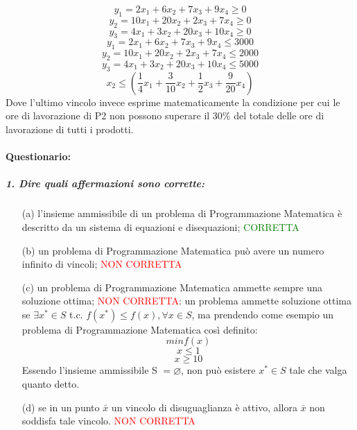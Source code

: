 \begin{equation*}
    y_1 = 2x_1 + 6x_2 + 7x_3 + 9x_4 \geq 0
\end{equation*}
\begin{equation*}
    y_2 = 10x_1 + 20x_2 + 2x_3 + 7x_4 \geq 0
\end{equation*}
\begin{equation*}
    y_3 = 4x_1 + 3x_2 + 20x_3 + 10x_4 \geq 0
\end{equation*}
\begin{equation*}
    y_1 = 2x_1 + 6x_2 + 7x_3 + 9x_4 \leq 3000
\end{equation*}
\begin{equation*}
    y_2 = 10x_1 + 20x_2 + 2x_3 + 7x_4 \leq 2000
\end{equation*}
\begin{equation*}
    y_3 = 4x_1 + 3x_2 + 20x_3 + 10x_4 \leq 5000
\end{equation*}
\begin{equation*}
    x_2 \leq (\frac{1}{4}x_1 + \frac{3}{10}x_2 + \frac{1}{2}x_3 + \frac{9}{20}x_4) 
\end{equation*}
Dove l'ultimo vincolo invece esprime matematicamente la condizione per cui le ore di lavorazione di P2 non possono superare il 30\% del totale delle ore di lavorazione di tutti i prodotti.



\paragraph{Questionario:} 

\subparagraph{1. Dire quali affermazioni sono corrette:}
\begin{itemize}
    \item[(a)] l’insieme ammissibile di un problema di Programmazione Matematica è descritto da un sistema di equazioni e disequazioni; \textcolor{green}{CORRETTA}
    \item[(b)] un problema di Programmazione Matematica può avere un numero infinito di vincoli; \textcolor{red}{NON CORRETTA}
    \item[(c)] un problema di Programmazione Matematica ammette sempre una soluzione ottima; \textcolor{red}{NON CORRETTA}: un problema ammette soluzione ottima se $\exists x^*\in S$ t.c. $f(x^*) \leq f(x), \forall x \in S$, ma prendendo come esempio un problema di Programmazione Matematica così definito:
    \begin{equation*}
        min f(x)
    \end{equation*}
    \begin{equation*}
        x \leq 1
    \end{equation*}
    \begin{equation*}
        x \geq 10
    \end{equation*}
    Essendo l'insieme ammissibile S $= \varnothing$, non può esistere $x^* \in S$ tale che valga quanto detto.
    \item[(d)] se in un punto $\bar{x}$ un vincolo di disuguaglianza è attivo, allora  $\bar{x}$ non soddisfa tale vincolo. \textcolor{red}{NON CORRETTA}
\end{itemize}


